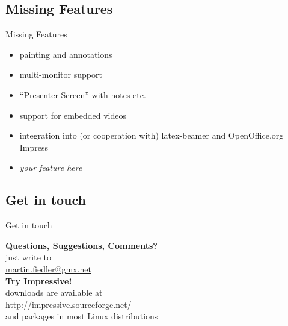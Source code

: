 \documentclass[bigger,hyperref={colorlinks=true,linkcolor=white,urlcolor=blue}]{beamer}
\begin{document}
\subsection{Missing Features}
\begin{frame}{Missing Features}
    \begin{itemize}
        \item painting and annotations
        \item multi-monitor support
        \item ``Presenter Screen'' with notes etc.
        \item support for embedded videos
        \item integration into (or cooperation with) latex-beamer
              and OpenOffice.org Impress
        \item \alert{\emph{your feature here}}
    \end{itemize}
\end{frame}

\subsection{Get in touch}
\begin{frame}{Get in touch}
\begin{center}
    \textbf{Questions, Suggestions, Comments?} \\
    just write to \\
    \href{mailto:martin.fiedler@gmx.net}{martin.fiedler@gmx.net}
    \vspace{1.5cm} \\
    \textbf{Try Impressive!} \\
    downloads are available at \\
    \href{http://impressive.sourceforge.net/}{http://impressive.sourceforge.net/} \\
    and packages in most Linux distributions
\end{center}
\end{frame}
\end{document}
